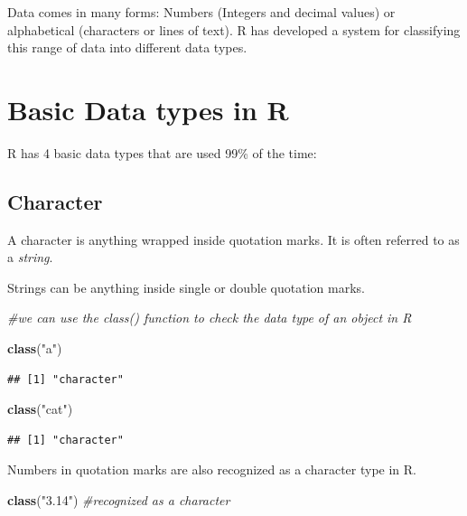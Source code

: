 \documentclass[
]{book}
\newenvironment{Shaded}{\begin{snugshade}}{\end{snugshade}}
\newcommand{\CommentTok}[1]{\textcolor[rgb]{0.56,0.35,0.01}{\textit{#1}}}
\newcommand{\FunctionTok}[1]{\textcolor[rgb]{0.13,0.29,0.53}{\textbf{#1}}}
\newcommand{\NormalTok}[1]{#1}
\newcommand{\StringTok}[1]{\textcolor[rgb]{0.31,0.60,0.02}{#1}}
\begin{document}
Data comes in many forms: Numbers (Integers and decimal values) or alphabetical (characters or lines of text). R has developed a system for classifying this range of data into different data types.

\hypertarget{basic-data-types-in-r}{%
\section{Basic Data types in R}\label{basic-data-types-in-r}}

R has 4 basic data types that are used 99\% of the time:

\hypertarget{character}{%
\subsection{Character}\label{character}}

A character is anything wrapped inside quotation marks. It is often referred to as a \emph{string}.

Strings can be anything inside single or double quotation marks.

\begin{Shaded}
\begin{Highlighting}[]
\CommentTok{\#we can use the class() function to check the data type of an object in R}

\FunctionTok{class}\NormalTok{(}\StringTok{"a"}\NormalTok{)}
\end{Highlighting}
\end{Shaded}

\begin{verbatim}
## [1] "character"
\end{verbatim}

\begin{Shaded}
\begin{Highlighting}[]
\FunctionTok{class}\NormalTok{(}\StringTok{"cat"}\NormalTok{)}
\end{Highlighting}
\end{Shaded}

\begin{verbatim}
## [1] "character"
\end{verbatim}

Numbers in quotation marks are also recognized as a character type in R.

\begin{Shaded}
\begin{Highlighting}[]
\FunctionTok{class}\NormalTok{(}\StringTok{"3.14"}\NormalTok{) }\CommentTok{\#recognized as a character}
\end{Highlighting}
\end{Shaded}
\end{document}
